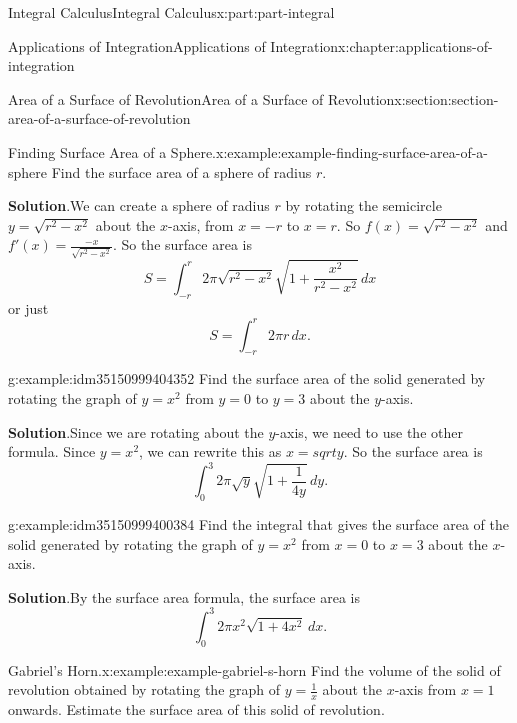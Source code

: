 \documentclass[twoside,10pt,]{tufte-book}
\newcommand{\blocktitlefont}{\relax}
\numberwithin{equation}{part}
\begin{document}
\begin{partptx}{Integral Calculus}{}{Integral Calculus}{}{}{x:part:part-integral}
\begin{chapterptx}{Applications of Integration}{}{Applications of Integration}{}{}{x:chapter:applications-of-integration}
\begin{sectionptx}{Area of a Surface of Revolution}{}{Area of a Surface of Revolution}{}{}{x:section:section-area-of-a-surface-of-revolution}
\begin{equation*}
\end{equation*}
%
\begin{example}{Finding Surface Area of a Sphere.}{x:example:example-finding-surface-area-of-a-sphere}%
Find the surface area of a sphere of radius \(r\).%
\par\smallskip%
\noindent\textbf{\blocktitlefont Solution}.\hypertarget{g:solution:idm35150999408192}{}\quad{}We can create a sphere of radius \(r\) by rotating the semicircle \(y=\sqrt{r^{2}-x^{2}}\) about the \(x\)-axis, from \(x=-r\) to \(x=r\). So \(f(x)=\sqrt{r^{2}-x^{2}}\) and \(f'(x)=\displaystyle\frac{-x}{\sqrt{r^{2}-x^{2}}}\). So the surface area is%
\begin{equation*}
S=\int_{-r}^{r}2\pi\sqrt{r^{2}-x^{2}}\sqrt{1+\frac{x^{2}}{r^{2}-x^{2}}}\,dx
\end{equation*}
or just%
\begin{equation*}
S=\int_{-r}^{r}2\pi r \, dx.
\end{equation*}
%
\end{example}
\begin{example}{}{g:example:idm35150999404352}%
Find the surface area of the solid generated by rotating the graph of \(y=x^{2}\) from \(y=0\) to \(y=3\) about the \(y\)-axis.%
\par\smallskip%
\noindent\textbf{\blocktitlefont Solution}.\hypertarget{g:solution:idm35150999402304}{}\quad{}Since we are rotating about the \(y\)-axis, we need to use the other formula. Since \(y=x^{2}\), we can rewrite this as \(x=sqrt{y}\). So the surface area is%
\begin{equation*}
\int_{0}^{3}2\pi\sqrt{y}\sqrt{1+\frac{1}{4y}}\,dy.
\end{equation*}
%
\end{example}
\begin{example}{}{g:example:idm35150999400384}%
Find the integral that gives the surface area of the solid generated by rotating the graph of \(y=x^{2}\) from \(x=0\) to \(x=3\) about the \(x\)-axis.%
\par\smallskip%
\noindent\textbf{\blocktitlefont Solution}.\hypertarget{g:solution:idm35150999398336}{}\quad{}By the surface area formula, the surface area is%
\begin{equation*}
\int_{0}^{3}2 \pi x^{2} \sqrt{1+4x^{2}}\,dx.
\end{equation*}
%
\end{example}
\begin{example}{Gabriel's Horn.}{x:example:example-gabriel-s-horn}%
Find the volume of the solid of revolution obtained by rotating the graph of \(y = \frac{1}{x}\) about the \(x\)-axis from \(x = 1\) onwards. Estimate the surface area of this solid of revolution.%

\end{example}
\end{sectionptx}
\end{chapterptx}
\end{partptx}
\end{document}
